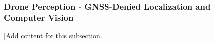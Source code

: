 
\subsubsection{Drone Perception - GNSS-Denied Localization and Computer Vision}
\label{subsubsec:design_6_6_drone_perception_gnss_denied}

[Add content for this subsection.]
